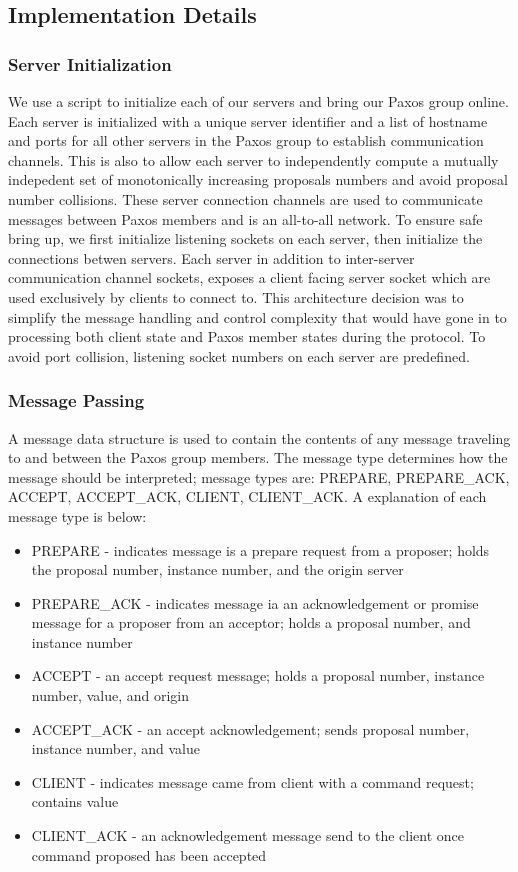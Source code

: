 \documentclass{article}
\begin{document}
\subsection{Implementation Details}

\subsubsection{Server Initialization}

We use a script to initialize each of our servers and bring our Paxos group online.
Each server is initialized with a unique server identifier and a list of hostname and ports for all other servers in the Paxos group to establish communication channels.
This is also to allow each server to independently compute a mutually indepedent set of monotonically increasing proposals numbers and avoid proposal number collisions.
These server connection channels are used to communicate messages between Paxos members and is an all-to-all network.
To ensure safe bring up, we first initialize listening sockets on each server, then initialize the connections betwen servers.
Each server in addition to inter-server communication channel sockets, exposes a client facing server socket which are used exclusively by clients to connect to.
This architecture decision was to simplify the message handling and control complexity that would have gone in to processing both client state and Paxos member states during the protocol.
To avoid port collision, listening socket numbers on each server are predefined.

\subsubsection{Message Passing}

A message data structure is used to contain the contents of any message traveling to and between the Paxos group members.
The message type determines how the message should be interpreted; message types are: PREPARE, PREPARE\_ACK, ACCEPT, ACCEPT\_ACK, CLIENT, CLIENT\_ACK.
A explanation of each message type is below:
\begin{itemize}
\item PREPARE - indicates message is a prepare request from a proposer; holds the proposal number, instance number, and the origin server
\item PREPARE\_ACK - indicates message ia an acknowledgement or promise message for a proposer from an acceptor; holds a proposal number, and instance number
\item ACCEPT - an accept request message; holds a proposal number, instance number, value, and origin
\item ACCEPT\_ACK - an accept acknowledgement; sends proposal number, instance number, and value
\item CLIENT - indicates message came from client with a command request; contains value
\item CLIENT\_ACK - an acknowledgement message send to the client once command proposed has been accepted
\end{itemize}
\end{document}
